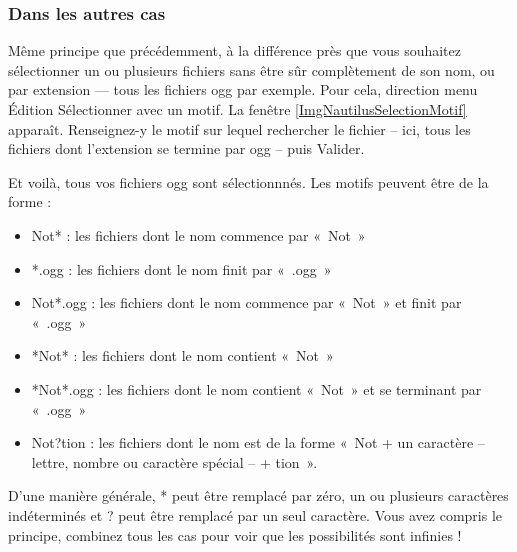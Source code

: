 \subsubsection{Dans les autres cas}
Même principe que précédemment, à la différence près que vous souhaitez sélectionner un ou plusieurs fichiers sans être sûr complètement de son nom, ou par extension --- tous les fichiers ogg par exemple. Pour cela, direction menu Édition \FlecheDroite Sélectionner avec un motif. La fenêtre \ref{ImgNautilusSelectionMotif} apparaît. Renseignez-y le motif sur lequel rechercher le fichier -- ici, tous les fichiers dont l'extension se termine par ogg -- puis Valider.\par
{}
Et voilà, tous vos fichiers ogg sont sélectionnnés. Les motifs peuvent être de la forme :\par
\begin{itemize}
\item Not* : les fichiers dont le nom commence par «~Not~»
\item *.ogg : les fichiers dont le nom finit par «~.ogg~»
\item Not*.ogg : les fichiers dont le nom commence par «~Not~» et finit par «~.ogg~»
\item *Not* : les fichiers dont le nom contient «~Not~»
\item *Not*.ogg : les fichiers dont le nom contient «~Not~» et se terminant par «~.ogg~»
\item Not?tion : les fichiers dont le nom est de la forme «~Not + un caractère -- lettre, nombre ou caractère spécial -- + tion~».
\end{itemize}
D'une manière générale, * peut être remplacé par zéro, un ou plusieurs caractères indéterminés et ? peut être remplacé par un seul caractère. Vous avez compris le principe, combinez tous les cas pour voir que les possibilités sont infinies !

